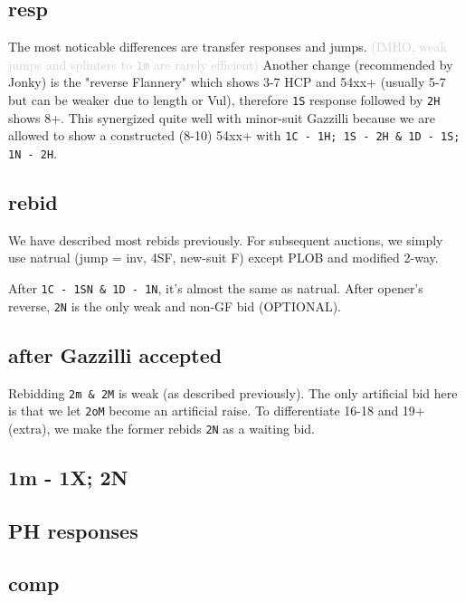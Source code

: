 \subsection{resp}

The most noticable differences are transfer responses and jumps.
\textcolor{lightgrey}{(IMHO, weak jumps and splinters to \texttt{1m} are rarely efficient)}
Another change (recommended by Jonky) is the "reverse Flannery" which shows 3-7 HCP and 54xx+ (usually 5-7 but can be weaker due to length or Vul), therefore \texttt{1S} response followed by \texttt{2H} shows 8+.
This synergized quite well with minor-suit Gazzilli because we are allowed to show a constructed (8-10) 54xx+ with \texttt{1C - 1H; 1S - 2H \& 1D - 1S; 1N - 2H}.


\subsection{rebid}

We have described most rebids previously. For subsequent auctions, we simply use natrual (jump = inv, 4SF, new-suit F) except PLOB and modified 2-way.



After \texttt{1C - 1SN \& 1D - 1N}, it's almost the same as natrual. After opener's reverse, \texttt{2N} is the only weak and non-GF bid (OPTIONAL).


\subsection{after Gazzilli accepted}

Rebidding \texttt{2m \& 2M} is weak (as described previously).
The only artificial bid here is that we let \texttt{2oM} become an artificial raise.
To differentiate 16-18 and 19+ (extra), we make the former rebids \texttt{2N} as a waiting bid.


\subsection{1m - 1X; 2N}



\subsection{PH responses}


\subsection{comp}


